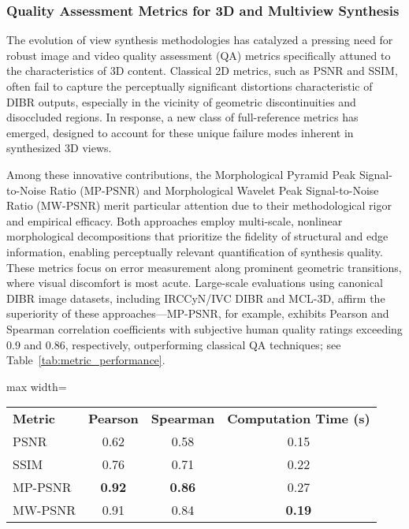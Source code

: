 \documentclass[sigconf]{acmart}
\begin{document}
\subsubsection{Quality Assessment Metrics for 3D and Multiview Synthesis}

The evolution of view synthesis methodologies has catalyzed a pressing need for robust image and video quality assessment (QA) metrics specifically attuned to the characteristics of 3D content. Classical 2D metrics, such as PSNR and SSIM, often fail to capture the perceptually significant distortions characteristic of DIBR outputs, especially in the vicinity of geometric discontinuities and disoccluded regions. In response, a new class of full-reference metrics has emerged, designed to account for these unique failure modes inherent in synthesized 3D views.

Among these innovative contributions, the Morphological Pyramid Peak Signal-to-Noise Ratio (MP-PSNR) and Morphological Wavelet Peak Signal-to-Noise Ratio (MW-PSNR) merit particular attention due to their methodological rigor and empirical efficacy. Both approaches employ multi-scale, nonlinear morphological decompositions that prioritize the fidelity of structural and edge information, enabling perceptually relevant quantification of synthesis quality. These metrics focus on error measurement along prominent geometric transitions, where visual discomfort is most acute. Large-scale evaluations using canonical DIBR image datasets, including IRCCyN/IVC DIBR and MCL-3D, affirm the superiority of these approaches—MP-PSNR, for example, exhibits Pearson and Spearman correlation coefficients with subjective human quality ratings exceeding 0.9 and 0.86, respectively, outperforming classical QA techniques; see Table~\ref{tab:metric_performance}.

\begin{table*}[htbp]
\centering
\caption{Comparison of quality assessment metrics on DIBR image datasets.}
\label{tab:metric_performance}
\begin{adjustbox}{max width=\textwidth}
\begin{tabular}{lccc}
\toprule
\textbf{Metric} & \textbf{Pearson} & \textbf{Spearman} & \textbf{Computation Time (s)} \\
PSNR     & 0.62 & 0.58 & 0.15 \\
SSIM     & 0.76 & 0.71 & 0.22 \\
MP-PSNR  & \textbf{0.92} & \textbf{0.86} & 0.27 \\
MW-PSNR  & 0.91 & 0.84 & \textbf{0.19} \\
\bottomrule
\end{tabular}
\end{adjustbox}
\end{table*}
\end{document}
